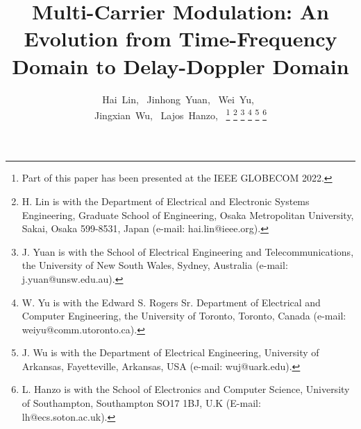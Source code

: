 \documentclass[journal]{IEEEtran}
\begin{document}
%

\title{Multi-Carrier Modulation: An Evolution from Time-Frequency Domain to Delay-Doppler Domain}



%
%
%

\author{Hai~Lin,~
  Jinhong~Yuan,~
  Wei~Yu,~ \\
  Jingxian~Wu,~   Lajos~Hanzo,~%
  \thanks{Part of this paper has been presented at the IEEE GLOBECOM 2022.}
  \thanks{H. Lin is with the Department of Electrical and Electronic Systems Engineering, Graduate School of Engineering, Osaka Metropolitan University, Sakai, Osaka 599-8531, Japan (e-mail: hai.lin@ieee.org).}%
  \thanks{J. Yuan is with the School of Electrical Engineering and Telecommunications, the University of New South Wales, Sydney, Australia (e-mail: j.yuan@unsw.edu.au).}%
  \thanks{W. Yu is with the Edward S. Rogers Sr. Department of Electrical and Computer Engineering, the University of Toronto, Toronto, Canada (e-mail: weiyu@comm.utoronto.ca).}%
  \thanks{J. Wu is with the Department of Electrical Engineering, University of Arkansas, Fayetteville, Arkansas, USA (e-mail: wuj@uark.edu).}
  \thanks{L. Hanzo is with the School of Electronics and Computer Science, University of Southampton, Southampton SO17 1BJ, U.K (E-mail:
    lh@ecs.soton.ac.uk).}}
\end{document}
